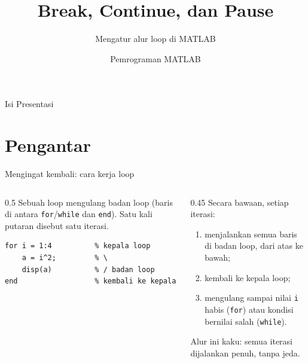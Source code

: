 \documentclass[aspectratio=169,10pt]{beamer}
\title{Break, Continue, dan Pause}
\subtitle{Mengatur alur loop di MATLAB}
\author{Pemrograman MATLAB}
\date{}
\newcommand{\kode}[1]{\texttt{#1}}
\begin{document}
\maketitle

\begin{frame}[fragile]{Isi Presentasi}
  \tableofcontents
\end{frame}

\section{Pengantar}

\begin{frame}[fragile]{Mengingat kembali: cara kerja loop}
  \begin{columns}[T]
    \begin{column}{0.5\textwidth}
      Sebuah loop mengulang \alert{badan loop} (baris di antara \kode{for}/\kode{while} dan \kode{end}).
      Satu kali putaran disebut satu \alert{iterasi}.
      \vspace{6pt}
\begin{lstlisting}
for i = 1:4          % kepala loop
    a = i^2;         % \
    disp(a)          % / badan loop
end                  % kembali ke kepala
\end{lstlisting}
    \end{column}
    \begin{column}{0.45\textwidth}
      Secara bawaan, setiap iterasi:
      \begin{enumerate}
        \item menjalankan \alert{semua} baris di badan loop, dari atas ke bawah;
        \item kembali ke kepala loop;
        \item mengulang sampai nilai \kode{i} habis (\kode{for}) atau kondisi bernilai salah (\kode{while}).
      \end{enumerate}
      \vspace{4pt}
      Alur ini \alert{kaku}: semua iterasi dijalankan penuh, tanpa jeda.
    \end{column}
  \end{columns}
\end{frame}
\end{document}
